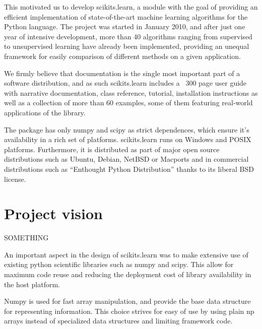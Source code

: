 \documentclass[twoside,11pt]{article}
\begin{document}


This motivated us to develop scikits.learn, a module with the goal of
providing an efficient implementation of state-of-the-art machine
learning algorithms for the Python language. The project was started
in January 2010, and after just one year of intensive development,
more than 40 algorithms ranging from supervised to unsupervised
learning have already been implemented, providing an unequal framework
for easily comparison of different methods on a given application.


We firmly believe that documentation is the single most important part
of a software distribution, and as such scikits.learn includes a ~300
page user guide with narrative documentation, class reference,
tutorial, installation instructions as well as a collection of more
than 60 examples, some of them featuring real-world applications of
the library.


The package has only numpy and scipy as strict dependences, which
ensure it's availability in a rich set of platforms. scikits.learn
runs on Windows and POSIX platforms. Furthermore, it is distributed as
part of major open source distributions such as Ubuntu, Debian, NetBSD
or Macports and in commercial distributions such as ``Enthought Python
Distribution'' thanks to its liberal BSD license.


\section{Project vision}

SOMETHING

An important aspect in the design of scikits.learn was to make
extensive use of existing python scientific libraries such as numpy
and scipy. This allow for maximum code reuse and reducing the
deployment cost of library availability in the host platform.

Numpy is used for fast array manipulation, and provide the base data
structure for representing information. This choice strives for easy
of use by using plain np arrays instead of specialized data structures
and limiting framework code.
\end{document}
